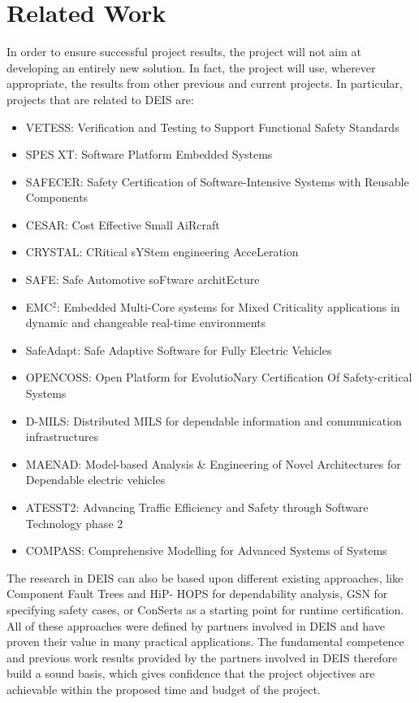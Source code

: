 \section{Related Work}
In order to ensure successful project results, the project will not aim at developing an entirely new solution. In fact, the project will use, wherever appropriate, the results from other previous and current projects. In particular, projects that are related to DEIS are: 
\begin{itemize}
	\item VETESS: Verification and Testing to Support Functional Safety Standards
	\item SPES XT: Software Platform Embedded Systems
	\item SAFECER: Safety Certification of Software-Intensive Systems with Reusable Components
	\item CESAR: Cost Effective Small AiRcraft
	\item CRYSTAL: CRitical sYStem engineering AcceLeration
	\item SAFE: Safe Automotive soFtware architEcture
	\item EMC$^2$: Embedded Multi-Core systems for Mixed Criticality applications in dynamic and changeable real-time environments
	\item SafeAdapt: Safe Adaptive Software for Fully Electric Vehicles
	\item OPENCOSS: Open Platform for EvolutioNary Certification Of Safety-critical Systems 
	\item D-MILS: Distributed MILS for dependable information and communication infrastructures
	\item MAENAD: Model-based Analysis \& Engineering of Novel Architectures for Dependable electric vehicles
	\item ATESST2: Advancing Traffic Efficiency and Safety through Software Technology phase 2
	\item COMPASS: Comprehensive Modelling for Advanced Systems of Systems
\end{itemize}

The research in DEIS can also be based upon different existing approaches, like Component Fault Trees \cite{Kaiser2003} and HiP- HOPS \cite{Papadopoulos1999} for dependability analysis, GSN \cite{kelly2004goal} for specifying safety cases, or ConSerts \cite{Schneider2003} as a starting point for runtime certification. All of these approaches were defined by partners involved in DEIS and have proven their value in many practical applications. The fundamental competence and previous work results provided by the partners involved in DEIS therefore build a sound basis, which gives confidence that the project objectives are achievable within the proposed time and budget of the project.